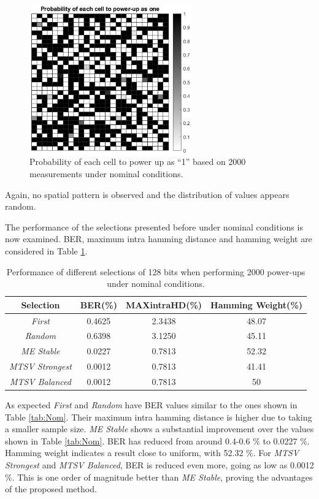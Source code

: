 \begin{figure}[H]
    \centering
    \includegraphics[width=7cm]{images/p_2000_Nom.png}
    \caption{Probability of each cell to power up as ``1'' based on 2000 measurements under nominal conditions. }
    \label{fig:p_2000_Nom}
\end{figure}

Again, no spatial pattern is observed and the distribution of values appears random.  

The performance of the selections presented before under nominal conditions is now examined. BER, maximum intra hamming distance and hamming weight are considered in Table \ref{tab:nom_selections}.

\begin{table}[H]
  \centering
  \caption{Performance of different selections of 128 bits when performing 2000 power-ups under nominal conditions.}
    \begin{tabular}{|c|c|c|c|}
    \hline
    Selection& BER(\%)   & MAXintraHD(\%) & Hamming Weight(\%) \bigstrut\\
    \hline
   \textit{First}& 0.4625 & 2.3438 & 48.07 \bigstrut\\
    \hline
    \textit{Random} & 0.6398 & 3.1250 & 45.11 \bigstrut\\
    \hline
    \textit{ME Stable} & 0.0227 & 0.7813 & 52.32 \bigstrut\\
    \hline
    \textit{MTSV Strongest} & 0.0012 & 0.7813 & 41.41 \bigstrut\\
    \hline
    \textit{MTSV Balanced} & 0.0012 & 0.7813 & 50 \bigstrut\\
    \hline
    \end{tabular}%
  \label{tab:nom_selections}%
\end{table}%

As expected \textit{First} and \textit{Random} have BER values similar to the ones shown in Table \ref{tab:Nom}. Their maximum intra hamming distance is higher due to taking a smaller sample size. \textit{ME Stable} shows a substantial improvement over the values shown in Table \ref{tab:Nom}. BER has reduced from around 0.4-0.6 \% to 0.0227 \%. Hamming weight indicates a result close to uniform, with 52.32 \%. For \textit{MTSV Strongest} and \textit{MTSV Balanced}, BER is reduced even more, going as low as 0.0012 \%. This is one order of magnitude better than \textit{ME Stable}, proving the advantages of the proposed method. 

